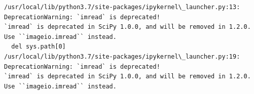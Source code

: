 \documentclass[11pt]{article}
\begin{document}
    \begin{Verbatim}[commandchars=\\\{\}]
/usr/local/lib/python3.7/site-packages/ipykernel\_launcher.py:13: DeprecationWarning: `imread` is deprecated!
`imread` is deprecated in SciPy 1.0.0, and will be removed in 1.2.0.
Use ``imageio.imread`` instead.
  del sys.path[0]
/usr/local/lib/python3.7/site-packages/ipykernel\_launcher.py:19: DeprecationWarning: `imread` is deprecated!
`imread` is deprecated in SciPy 1.0.0, and will be removed in 1.2.0.
Use ``imageio.imread`` instead.

    \end{Verbatim}

    \begin{center}
    \end{center}
    { \hspace*{\fill} \\}
    
    \begin{center}
    \end{center}
    { \hspace*{\fill} \\}
    
\end{document}
